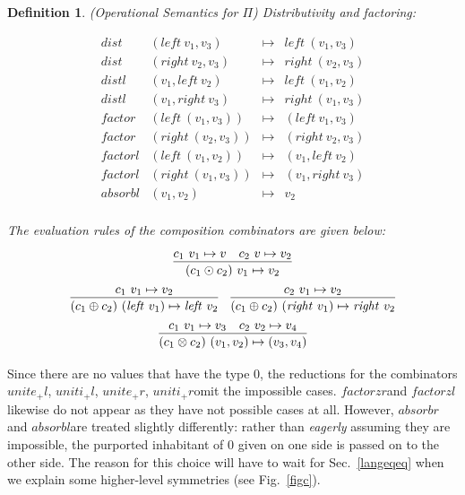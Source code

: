 \documentclass{article}
\newtheorem{definition}[theorem]{Definition}
\newcommand{\identlp}{\ensuremath{\mathit{unite}_+\mathit{l}}}
\newcommand{\identrp}{\ensuremath{\mathit{uniti}_+\mathit{l}}}
\newcommand{\identlsp}{\ensuremath{\mathit{unite}_+\mathit{r}}}
\newcommand{\identrsp}{\ensuremath{\mathit{uniti}_+\mathit{r}}}
\newcommand{\absorbr}{\ensuremath{\mathit{absorbr}}}
\newcommand{\absorbl}{\ensuremath{\mathit{absorbl}}}
\newcommand{\factorzr}{\ensuremath{\mathit{factorzr}}}
\newcommand{\factorzl}{\ensuremath{\mathit{factorzl}}}
\newcommand{\dist}{\ensuremath{\mathit{dist}}}
\newcommand{\factor}{\ensuremath{\mathit{factor}}}
\newcommand{\distl}{\ensuremath{\mathit{distl}}}
\newcommand{\factorl}{\ensuremath{\mathit{factorl}}}
\begin{document}
\begin{definition}{(Operational Semantics for \ensuremath{\Pi })}
Distributivity and factoring:

\[\begin{array}{rlcl}
 \dist & (\mathit{left} ~v_1, v_3) &\mapsto & \mathit{left} ~(v_1, v_3) \\
 \dist & (\mathit{right} ~v_2, v_3) &\mapsto & \mathit{right} ~(v_2, v_3) \\
 \distl & (v_1, \mathit{left} ~v_2) &\mapsto & \mathit{left} ~(v_1, v_2) \\
 \distl & (v_1, \mathit{right} ~v_3) &\mapsto & \mathit{right} ~(v_1, v_3) \\
 \factor & (\mathit{left} ~(v_1, v_3)) &\mapsto & (\mathit{left} ~v_1, v_3) \\
 \factor & (\mathit{right} ~(v_2, v_3)) &\mapsto & (\mathit{right} ~v_2, v_3) \\
 \factorl & (\mathit{left} ~(v_1, v_2)) &\mapsto & (v_1, \mathit{left} ~v_2) \\
 \factorl & (\mathit{right} ~(v_1, v_3)) &\mapsto & (v_1, \mathit{right} ~v_3) \\
 \absorbl & (v_1 , v_2) & \mapsto & v_2 \\
 \end{array}\]

The evaluation rules of the composition combinators are given below:

$$
\infer{ (c_1\odot c_2) ~v_1 \mapsto v_2}{
	 c_1 ~v_1 \mapsto v
	&
	 c_2 ~v \mapsto v_2
}
$$
$$
\infer{ (c_1 \oplus c_2) ~(\mathit{left} ~v_1) \mapsto \mathit{left} ~v_2}{
	 c_1 ~v_1 \mapsto v_2
}
\quad
\infer{ (c_1 \oplus c_2) ~(\mathit{right} ~v_1) \mapsto \mathit{right} ~v_2}{
	 c_2 ~v_1 \mapsto v_2
}
$$
$$
\infer{ (c_1 \otimes c_2) ~(v_1, v_2) \mapsto (v_3, v_4)}{
	 c_1 ~v_1 \mapsto v_3
	&
	 c_2 ~v_2 \mapsto v_4
}
$$

\end{definition}

Since there are no values that have the type \ensuremath{0}, the reductions for
the combinators \identlp, \identrp, \identlsp, \identrsp omit the impossible
cases. \factorzr and \factorzl likewise do not appear as they have not
possible cases at all. However, \absorbr and \absorbl are treated slightly
differently: rather than \emph{eagerly} assuming they are impossible,
the purported inhabitant of $0$ given on one side is passed on to the other
side. The reason for this choice will have to wait for Sec.~\ref{langeqeq}
when we explain some higher-level symmetries (see Fig.~\ref{figc}).
\end{document}
